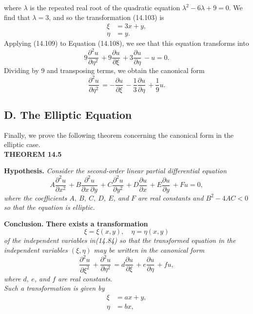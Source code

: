 \documentclass[11pt,a4paper, twoside]{report}
\newcommand{\pf}[2]{\dfrac{\partial #1}{\partial #2}\,}
\newcommand{\pfn}[3]{\dfrac{\partial^#3 #1}{\partial #2^#3}\,}
\newcommand{\pfp}[4]{\dfrac{\partial^#4 #1}{\partial #2\ \partial #3}\,}
\begin{document}
	where $\lambda$ is the repeated real root of the quadratic equation $\lambda^2 - 6\lambda + 9 = 0$. We find that $\lambda = 3$, and so the transformation (14.103) is
	\begin{equation}\tag{14.109}
		\begin{aligned}
			\xi &= 3x + y,\\
			\eta &= y.
		\end{aligned}
	\end{equation}
	Applying (14.109) to Equation (14.108), we see that this equation transforms into
	$$
	9 \pfn{u}{\eta}{2} + 9\pf{u}{\xi} + 3\pf{u}{\eta} - u =0.
	$$
	Dividing by 9 and transposing terms, we obtain the canonical form
	$$
	\pfn{u}{\eta}{2} = -\pf{u}{\xi} -\frac{1}{3}\pf{u}{\eta} + \frac{1}{9}u.
	$$
	\subsection*{D. The Elliptic Equation}
	Finally, we prove the following theorem concerning the canonical form in the elliptic case.\\
	\textbf{\large THEOREM 14.5}\par
	\textbf{Hypothesis.} \textit{Consider the second-order linear partial differential equation}
	\begin{equation}\tag{14.84}
		A\pfn{u}{x}{2} + B\pfp{u}{x}{y}{2} + C\pfn{u}{y}{2} + D\pf{u}{x} + E\pf{u}{y} + Fu = 0,
	\end{equation}
	\textit{where the coefficients $A,\ B,\ C,\ D,\ E$, and $F$ are real constants and $B^2 - 4AC < 0$ so that the equation is elliptic.}\par
	\textbf{Conclusion.} \textbf{There exists a transformation}
	\begin{equation}\tag{14.85}
		\xi = \xi(x, y),\quad \eta = \eta(x, y)
	\end{equation}
	\textit{of the independent variables in(14.84) so that the transformed equation in the independent variables $(\xi, \eta)$ may be written in the canonical form}
	\begin{equation}\tag{14.110}
		\pfn{u}{\xi}{2} + \pfn{u}{\eta}{2} = d\pf{u}{\xi} + e\pf{u}{\eta} + fu, 
	\end{equation}
	\textit{where $d,\ e$, and $f$ are real constants}.\\
	\textit{Such a transformation is given by}
	\begin{equation}\tag{14.111}
		\begin{aligned}
			\xi &= ax + y,\\
			\eta &= bx,
		\end{aligned}
	\end{equation}
\end{document}

